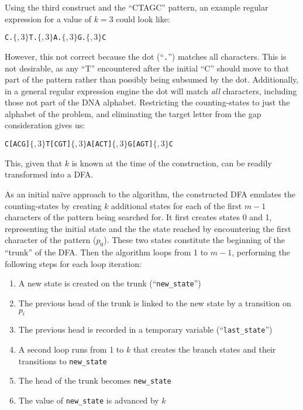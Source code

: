 Using the third construct and the ``CTAGC'' pattern, an example regular expression for a value of $k = 3$ could look like:

\begin{center}
\texttt{C.$\lbrace ,3 \rbrace$T.$\lbrace ,3 \rbrace$A.$\lbrace ,3 \rbrace$G.$\lbrace ,3 \rbrace$C}
\end{center}

However, this not correct because the dot (``\texttt{.}'') matches all characters. This is not desirable, as any ``T'' encountered after the initial ``C'' should move to that part of the pattern rather than possibly being subsumed by the dot. Additionally, in a general regular expression engine the dot will match \textit{all} characters, including those not part of the DNA alphabet. Restricting the counting-states to just the alphabet of the problem, and eliminating the target letter from the gap consideration gives us:

\begin{center}
\texttt{C[ACG]$\lbrace ,3 \rbrace$T[CGT]$\lbrace ,3 \rbrace$A[ACT]$\lbrace ,3 \rbrace$G[AGT]$\lbrace ,3 \rbrace$C}
\end{center}

This, given that $k$ is known at the time of the construction, can be readily transformed into a DFA.

As an initial na\"{i}ve approach to the algorithm, the constructed DFA emulates the counting-states by creating $k$ additional states for each of the first $m - 1$ characters of the pattern being searched for. It first creates states 0 and 1, representing the initial state and the the state reached by encountering the first character of the pattern ($p_0$). These two states constitute the beginning of the ``trunk'' of the DFA. Then the algorithm loops from 1 to $m-1$, performing the following steps for each loop iteration:

\begin{enumerate}
\item A new state is created on the trunk (``\texttt{new\_state}'')
\item The previous head of the trunk is linked to the new state by a transition on $p_i$
\item The previous head is recorded in a temporary variable (``\texttt{last\_state}'')
\item A second loop runs from 1 to $k$ that creates the branch states and their transitions to \texttt{new\_state}
\item The head of the trunk becomes \texttt{new\_state}
\item The value of \texttt{new\_state} is advanced by $k$
\end{enumerate}

